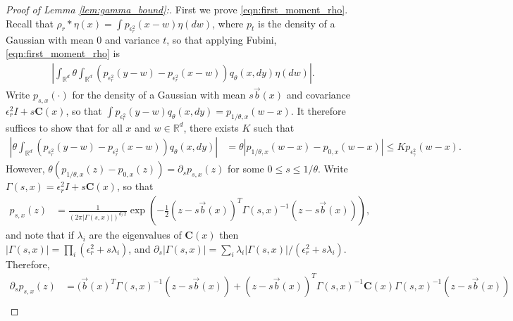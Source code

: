 \documentclass[EJP]{ejpecp} %
\newcommand{\IR}{\mathbb R}
\newcommand{\meanq}{\vec b}    %
\newcommand{\covq}{\mathbf{C}}     %
\newcommand{\kernel}{\rho}  %
\newcommand{\smooth}[1]{\kernel_{#1} \! * \!}  %
\begin{document}
\begin{proof}[Proof of Lemma \ref{lem:gamma_bound}:]

    First we prove \eqref{eqn:first_moment_rho}.
    Recall that $\smooth{r} \eta(x) = \int p_{\epsilon^2_r}(x - w) \eta(dw)$,
    where $p_t$ is the density of a Gaussian with mean 0 and variance $t$,
    so that applying Fubini, \eqref{eqn:first_moment_rho} is
    \begin{align*}
        \left|
        \int_{\IR^d}
        \theta
            \int_{\IR^d}
                ( p_{\epsilon_r^2}(y - w) - p_{\epsilon_r^2}(x - w) )
            q_\theta(x, dy)
        \eta(dw)
        \right| .
    \end{align*}
    Write $p_{s, x}(\cdot)$ for the density of a Gaussian
    with mean $s \meanq(x)$ and covariance $\epsilon_r^2 I + s \covq(x)$,
    so that $\int p_{\epsilon_r^2}(y - w) q_\theta(x, dy) = p_{1/\theta, x}(w-x)$.
    It therefore suffices to show that for all $x$ and $w \in \IR^d$,
    there exists $K$ such that
    \begin{align*}
        \left|
        \theta
            \int_{\IR^d}
                ( p_{\epsilon_r^2}(y-w) - p_{\epsilon_r^2}(x-w) )
            q_\theta(x, dy)
        \right|
        &=
        \theta \left|
            p_{1/\theta, x}(w-x) - p_{0, x}(w-x)
        \right|
        \le
        K p_{\epsilon^2_\gamma}(w-x) .
    \end{align*}
    However,
    $\theta( p_{1/\theta, x}(z) - p_{0, x}(z) )
    = \partial_s p_{s, x}(z)$ for some $0 \le s \le 1/\theta$.
    Write $\Gamma(s,x) = \epsilon_r^2 I + s \covq(x)$,
    so that
    \begin{align*}
        p_{s, x}(z)
        &=
        \frac{1}{\left(2 \pi |\Gamma(s,x)|\right)^{d/2}}
        \exp\left(
            -\frac{1}{2} (z - s\meanq(x))^T \Gamma(s,x)^{-1} (z - s\meanq(x))
        \right) ,
    \end{align*}
    and note that if $\lambda_i$ are the eigenvalues of $\covq(x)$
    then $|\Gamma(s, x)| = \prod_i (\epsilon_r^2 + s \lambda_i)$,
    and
    $\partial_s |\Gamma(s, x)| = \sum_i \lambda_i |\Gamma(s, x)| / (\epsilon_r^2 + s \lambda_i)$.
    Therefore,
    \begin{align*}
        \partial_s p_{s, x}(z)
        &=
        \bigg(
            \meanq(x)^T \Gamma(s,x)^{-1} (z - s \meanq(x))
            +
            (z - s \meanq(x))^T
            \Gamma(s,x)^{-1} \covq(x) \Gamma(s,x)^{-1}
            (z - s \meanq(x))
        \\ & \qquad \qquad \qquad {}

\end{align*}
\end{proof}
\end{document}

